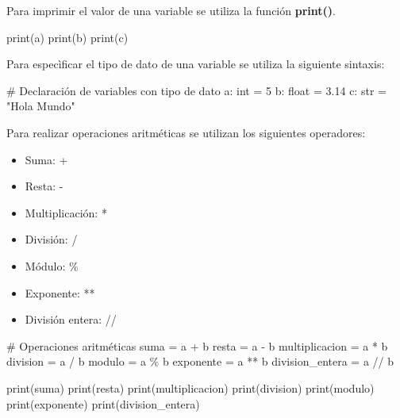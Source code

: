 \documentclass[
  a4paper,
  DIV=11,
  numbers=noendperiod,
  onepage,
  openany]{scrreprt}
\newenvironment{Shaded}{\begin{snugshade}}{\end{snugshade}}
\newcommand{\BuiltInTok}[1]{\textcolor[rgb]{0.00,0.23,0.31}{#1}}
\newcommand{\CommentTok}[1]{\textcolor[rgb]{0.37,0.37,0.37}{#1}}
\newcommand{\DecValTok}[1]{\textcolor[rgb]{0.68,0.00,0.00}{#1}}
\newcommand{\FloatTok}[1]{\textcolor[rgb]{0.68,0.00,0.00}{#1}}
\newcommand{\NormalTok}[1]{\textcolor[rgb]{0.00,0.23,0.31}{#1}}
\newcommand{\OperatorTok}[1]{\textcolor[rgb]{0.37,0.37,0.37}{#1}}
\newcommand{\StringTok}[1]{\textcolor[rgb]{0.13,0.47,0.30}{#1}}
\providecommand{\tightlist}{%
  \setlength{\itemsep}{0pt}\setlength{\parskip}{0pt}}\usepackage{longtable,booktabs,array}
\begin{document}
Para imprimir el valor de una variable se utiliza la función
\textbf{print()}.

\begin{Shaded}
\begin{Highlighting}[]
\BuiltInTok{print}\NormalTok{(a)}
\BuiltInTok{print}\NormalTok{(b)}
\BuiltInTok{print}\NormalTok{(c)}
\end{Highlighting}
\end{Shaded}

Para especìficar el tipo de dato de una variable se utiliza la siguiente
sintaxis:

\begin{Shaded}
\begin{Highlighting}[]
\CommentTok{\# Declaración de variables con tipo de dato}
\NormalTok{a: }\BuiltInTok{int} \OperatorTok{=} \DecValTok{5}
\NormalTok{b: }\BuiltInTok{float} \OperatorTok{=} \FloatTok{3.14}
\NormalTok{c: }\BuiltInTok{str} \OperatorTok{=} \StringTok{"Hola Mundo"}
\end{Highlighting}
\end{Shaded}

Para realizar operaciones aritméticas se utilizan los siguientes
operadores:

\begin{itemize}
\tightlist
\item
  Suma: +
\item
  Resta: -
\item
  Multiplicación: *
\item
  División: /
\item
  Módulo: \%
\item
  Exponente: **
\item
  División entera: //
\end{itemize}

\begin{Shaded}
\begin{Highlighting}[]
\CommentTok{\# Operaciones aritméticas}
\NormalTok{suma }\OperatorTok{=}\NormalTok{ a }\OperatorTok{+}\NormalTok{ b}
\NormalTok{resta }\OperatorTok{=}\NormalTok{ a }\OperatorTok{{-}}\NormalTok{ b}
\NormalTok{multiplicacion }\OperatorTok{=}\NormalTok{ a }\OperatorTok{*}\NormalTok{ b}
\NormalTok{division }\OperatorTok{=}\NormalTok{ a }\OperatorTok{/}\NormalTok{ b}
\NormalTok{modulo }\OperatorTok{=}\NormalTok{ a }\OperatorTok{\%}\NormalTok{ b}
\NormalTok{exponente }\OperatorTok{=}\NormalTok{ a }\OperatorTok{**}\NormalTok{ b}
\NormalTok{division\_entera }\OperatorTok{=}\NormalTok{ a }\OperatorTok{//}\NormalTok{ b}

\BuiltInTok{print}\NormalTok{(suma)}
\BuiltInTok{print}\NormalTok{(resta)}
\BuiltInTok{print}\NormalTok{(multiplicacion)}
\BuiltInTok{print}\NormalTok{(division)}
\BuiltInTok{print}\NormalTok{(modulo)}
\BuiltInTok{print}\NormalTok{(exponente)}
\BuiltInTok{print}\NormalTok{(division\_entera)}
\end{Highlighting}
\end{Shaded}
\end{document}
